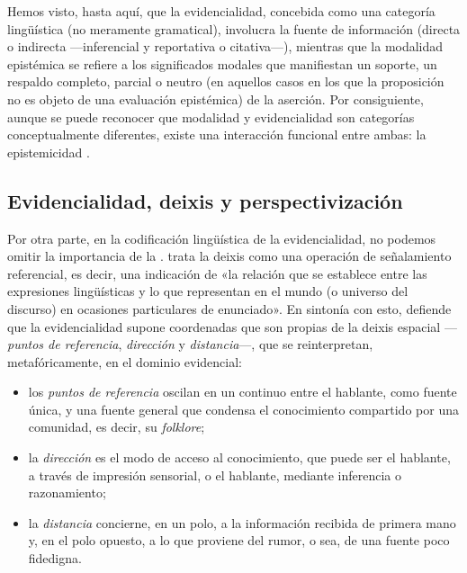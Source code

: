 Hemos visto, hasta aquí, que la evidencialidad, concebida como una categoría
lingüística (no meramente gramatical), involucra la fuente de información
(directa o indirecta ---inferencial y reportativa o citativa---), mientras que
la modalidad epistémica se refiere a los significados modales que manifiestan un
soporte, un respaldo completo, parcial o neutro (en aquellos casos en los que la
proposición no es objeto de una evaluación epistémica) de la aserción. Por
consiguiente, aunque se puede reconocer que modalidad y evidencialidad son
categorías conceptualmente diferentes, existe una interacción funcional entre
ambas: la epistemicidad \parencite{bybee2012}.

\subsection{Evidencialidad, deixis y perspectivización}\label{sec:14-deixis}

Por otra parte, en la codificación lingüística de la evidencialidad, no podemos
omitir la importancia de la . \textcite[319]{lyons1997} trata la
deixis como una operación de señalamiento referencial, es decir, una indicación
de «la relación que se establece entre las expresiones lingüísticas y lo que
representan en el mundo (o universo del discurso) en ocasiones particulares de
enunciado». En sintonía con esto, \textcite{bermudez2016} defiende que la
evidencialidad supone coordenadas que son propias de la deixis espacial
---\textit{puntos de referencia}, \textit{dirección} y \textit{distancia}---, que
se reinterpretan, metafóricamente, en el dominio evidencial:

\begin{itemize}
  \item los \textit{puntos de referencia} oscilan en un continuo entre el
        hablante, como fuente única, y una fuente general que condensa el
        conocimiento compartido por una comunidad, es decir, su
        \textit{folklore};
  \item la \textit{dirección} es el modo de acceso al conocimiento, que puede ser
         el hablante, a través de impresión sensorial, o 
        el hablante, mediante inferencia o razonamiento;
  \item la \textit{distancia} concierne, en un polo, a la información recibida de
        primera mano y, en el polo opuesto, a lo que proviene del rumor, o sea,
        de una fuente poco fidedigna.
\end{itemize}


